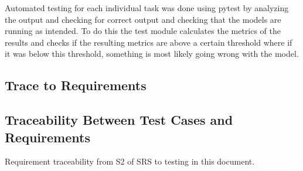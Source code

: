 \documentclass[12pt, titlepage]{article}
\begin{document}
Automated testing for each individual task was done using pytest by analyzing the output and checking for correct output and checking that the models are running as intended. To do this the test module calculates the metrics of the results and checks if the resulting metrics are above a certain threshold where if it was below this threshold, something is most likely going wrong with the model.


\begin{landscape}
\section{Trace to Requirements}
		\subsection{Traceability Between Test Cases and Requirements}

		Requirement traceability from S2 of SRS to testing in this document.


\end{landscape}
\end{document}
